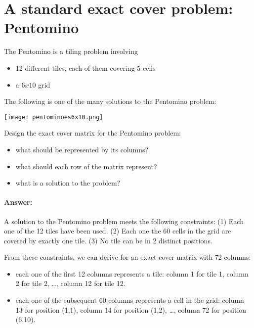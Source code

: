 \documentclass[table]{article}
\begin{document}
\section{A standard exact cover problem: Pentomino}

The Pentomino is a tiling problem involving
\begin{itemize}
\item 12 different tiles, each of them covering 5 cells
\item a $6x10$ grid
\end{itemize}

The following is one of the many solutions to the Pentomino problem:
\vspace{1em}

\begin{center}
\texttt{[image: pentominoes6x10.png]}
\end{center}

\vspace{1em}

Design the exact cover matrix for the Pentomino problem:
\begin{itemize}
	\item what should be represented by its columns?
	\item what should each row of the matrix represent?
	\item what is a solution to the problem?
\end{itemize}

\paragraph{Answer:} A solution to the Pentomino problem meets the following constraints:
	(1) Each one of the 12 tiles have been used.
	(2) Each one the 60 cells in the grid are covered by exactly one tile.
	(3) No tile can be in 2 distinct positions.

From these constraints, we can derive for an exact cover matrix with 72 columns:
\begin{itemize}
	\item each one of the first 12 columns represents a tile: column 1 for tile 1, column 2 for tile 2, \ldots, column 12 for tile 12.
	\item each one of the subsequent 60 columns represents a cell in the grid: column 13 for position (1,1), column 14 for position (1,2), \ldots, column 72 for position (6,10).
\end{itemize}
\end{document}
